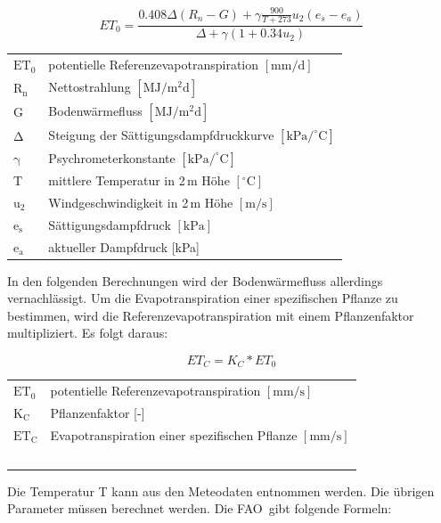 \begin{equation}
\label{eq:penman_ref}
ET_0=\frac{0.408\Delta \left(R_n-G\right)+\gamma \frac{900}{T+273}u_2\left(e_s-e_a\right)}{\Delta +\gamma\left(1+0.34u_2\right)}
\end{equation}
\begin{table}[H]
\centering
\begin{tabular}{ll}
$\mathrm{ET_0}$ & potentielle Referenzevapotranspiration $\mathrm{[mm/d]}$\\
$\mathrm{R_n}$ & Nettostrahlung $\mathrm{[MJ/m^2d]}$ \\
$\mathrm{G}$ & Bodenwärmefluss $\mathrm{[MJ/m^2d]}$\\
$\mathrm{\Delta}$ & Steigung der Sättigungsdampfdruckkurve $\mathrm{[kPa/^{\circ}C]}$\\
$\mathrm{\gamma}$ & Psychrometerkonstante $\mathrm{[kPa/^{\circ}C]}$\\
$\mathrm{T}$ & mittlere Temperatur in 2\,m Höhe $\mathrm{[^{\circ}C]}$\\
$\mathrm{u_2}$ & Windgeschwindigkeit in 2\,m Höhe $\mathrm{[m/s]}$\\
$\mathrm{e_s}$ & Sättigungsdampfdruck $\mathrm{[kPa]}$\\
$\mathrm{e_a}$ & aktueller Dampfdruck [kPa]\\
\end{tabular}
\end{table}

In den folgenden Berechnungen wird der Bodenwärmefluss allerdings vernachlässigt. Um die Evapotranspiration einer spezifischen Pflanze zu bestimmen, wird die Referenzevapotranspiration mit einem Pflanzenfaktor multipliziert. Es folgt daraus:

\begin{equation}
\label{eq:penman_spez}
ET_C=K_C*ET_0
\end{equation}
\begin{table}[H]
\centering
\begin{tabular}{ll}
$\mathrm{ET_0}$ & potentielle Referenzevapotranspiration $\mathrm{[mm/s]}$\\
$\mathrm{K_C}$ & Pflanzenfaktor [-]\\
$\mathrm{ET_C}$ & Evapotranspiration einer spezifischen Pflanze $\mathrm{[mm/s]}$\\\
\end{tabular}
\end{table}

Die Temperatur T kann aus den Meteodaten entnommen werden. Die übrigen Parameter müssen berechnet werden. Die FAO\,\cite{fao} gibt folgende Formeln:

